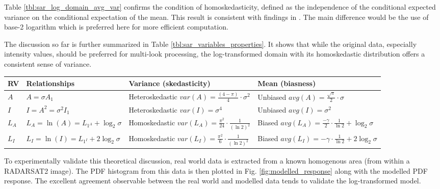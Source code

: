 Table \ref{tbl:sar_log_domain_avg_var} confirms the condition of homoskedasticity,  
defined as the independence of the conditional expected variance on the conditional expectation of the mean. 
This result is consistent with findings in \cite{Arsenault_JOptSocAm_1976}. 
The main difference would be the use of base-2 logarithm which is preferred here for more efficient computation. 

The discussion so far is further summarized in Table \ref{tbl:sar_variables_properties}.
It shows that while the original data, especially intensity values, should be preferred for 
multi-look processing, the log-transformed domain with its homoskedastic distribution offers a consistent sense of variance. 

\begin{table*}[t]
\scriptsize
\centering

\caption{ The properties of observable SAR random variables }
\label{tbl:sar_variables_properties}

\begin{tabular}{|l|l|l|l|}
\hline
 RV & Relationships  & Variance (skedasticity) & Mean (biasness) \\
\hline
$A$ 
	& $A=\sigma A_1 $ 
	& Heteroskedastic $var(A) = \frac{(4-\pi)}{4} \cdot \sigma^2 $ 
	& Unbiased $avg(A) = \frac{\sqrt{\pi}}{2} \cdot \sigma $ \\
$I$ 
	& $I=A^2=\sigma^2 I_1 $ 
	& Heteroskedastic $ var(I) = \sigma^4$ 
	& Unbiased $avg(I) = \sigma^2 $\\
$L_A$ 
	& $L_A=\ln(A)=L_{1^A} + \log_2{\sigma}$ 
	& Homoskedastic $var(L_A) = \frac{ \pi ^2}{24} \cdot \frac{1}{(\ln2)^2}$ 
	& Biased $avg(L_A) = \frac{ - \gamma }{2} \cdot \frac{1}{\ln2} + \log_2{\sigma}$ \\
$L_I$ 
	& $L_I=\ln(I)=L_{1^I} + 2 \log_2{\sigma}$  
	& Homoskedastic $var(L_I) = \frac{ \pi ^2}{6} \cdot \frac{1}{(\ln2)^2}$ 
	& Biased $avg(L_I) = - \gamma \cdot \frac{1}{\ln2} + 2 \log_2{\sigma}  $ \\
\hline
\end{tabular}

\end{table*}

To experimentally validate this theoretical discussion, real world data is extracted from a known  homogenous area (from within a RADARSAT2 image). The PDF histogram from this data is then plotted in 
Fig. \ref{fig:modelled_response} along with the modelled PDF response. 
The excellent agreement observable between the real world and modelled data tends to validate the log-transformed model. 

